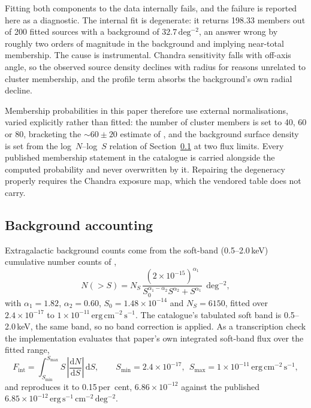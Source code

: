 \documentclass[11pt]{article}
\begin{document}
Fitting both components to the data internally fails, and the failure is reported here as a diagnostic. The internal fit is degenerate: it returns 198.33 members out of 200 fitted sources with a background of $32.7\,\mathrm{deg^{-2}}$, an answer wrong by roughly two orders of magnitude in the background and implying near-total membership. The cause is instrumental. Chandra sensitivity falls with off-axis angle, so the observed source density declines with radius for reasons unrelated to cluster membership, and the profile term absorbs the background's own radial decline.

Membership probabilities in this paper therefore use external normalisations, varied explicitly rather than fitted: the number of cluster members is set to 40, 60 or 80, bracketing the $\sim\!60\pm20$ estimate of \citet{Henleywillis2018}, and the background surface density is set from the log~$N$--log~$S$ relation of Section~\ref{sec:method-agn} at two flux limits. Every published membership statement in the catalogue is carried alongside the computed probability and never overwritten by it. Repairing the degeneracy properly requires the Chandra exposure map, which the vendored table does not carry.

\subsection{Background accounting}
\label{sec:method-agn}

Extragalactic background counts come from the soft-band (0.5--2.0\,keV) cumulative number counts of \citet{Moretti2003},
\begin{equation}
N(>S) = N_{S}\,\frac{(2\times10^{-15})^{\alpha_{1}}}{S_{0}^{\alpha_{1}-\alpha_{2}}S^{\alpha_{2}} + S^{\alpha_{1}}}\ \ \mathrm{deg^{-2}},
\end{equation}
with $\alpha_{1} = 1.82$, $\alpha_{2} = 0.60$, $S_{0} = 1.48\times10^{-14}$ and $N_{S} = 6150$, fitted over $2.4\times10^{-17}$ to $1\times10^{-11}\,\mathrm{erg\,cm^{-2}\,s^{-1}}$. The catalogue's tabulated soft band is 0.5--2.0\,keV, the same band, so no band correction is applied. As a transcription check the implementation evaluates that paper's own integrated soft-band flux over the fitted range,
\begin{equation}
F_{\mathrm{int}} = \int_{S_{\min}}^{S_{\max}} S\,\left|\frac{\mathrm{d}N}{\mathrm{d}S}\right|\,\mathrm{d}S ,
\qquad S_{\min} = 2.4\times10^{-17},\ \ S_{\max} = 1\times10^{-11}\,\mathrm{erg\,cm^{-2}\,s^{-1}},
\label{eq:moretticheck}
\end{equation}
and reproduces it to 0.15\,per~cent, $6.86\times10^{-12}$ against the published $6.85\times10^{-12}\,\mathrm{erg\,s^{-1}\,cm^{-2}\,deg^{-2}}$.
\end{document}
